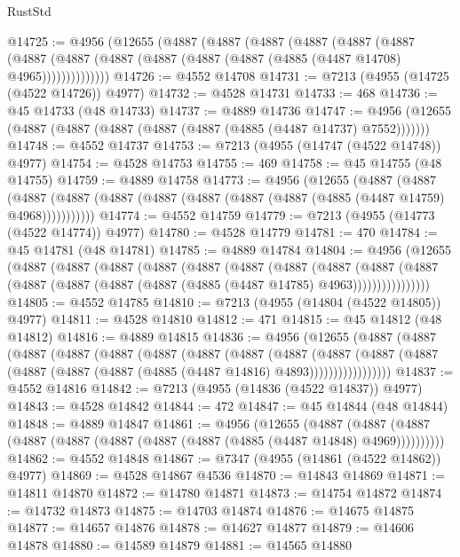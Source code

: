 \begin{lexlean}{RustStd}
\begin{coremodule}
@14725 := @4956
    (@12655
      (@4887
        (@4887
          (@4887
            (@4887
              (@4887
                (@4887
                  (@4887
                    (@4887 (@4887 (@4887 (@4887 (@4887 (@4885 (@4487 @14708) @4965))))))))))))))
@14726 := @4552 @14708
@14731 := @7213 (@4955 (@14725 (@4522 @14726)) @4977)
@14732 := @4528 @14731
@14733 := 468
@14736 := @45 @14733 (@48 @14733)
@14737 := @4889 @14736
@14747 := @4956 (@12655 (@4887 (@4887 (@4887 (@4887 (@4887 (@4885 (@4487 @14737) @7552)))))))
@14748 := @4552 @14737
@14753 := @7213 (@4955 (@14747 (@4522 @14748)) @4977)
@14754 := @4528 @14753
@14755 := 469
@14758 := @45 @14755 (@48 @14755)
@14759 := @4889 @14758
@14773 := @4956
    (@12655
      (@4887
        (@4887
          (@4887 (@4887 (@4887 (@4887 (@4887 (@4887 (@4887 (@4885 (@4487 @14759) @4968)))))))))))
@14774 := @4552 @14759
@14779 := @7213 (@4955 (@14773 (@4522 @14774)) @4977)
@14780 := @4528 @14779
@14781 := 470
@14784 := @45 @14781 (@48 @14781)
@14785 := @4889 @14784
@14804 := @4956
    (@12655
      (@4887
        (@4887
          (@4887
            (@4887
              (@4887
                (@4887
                  (@4887
                    (@4887
                      (@4887
                        (@4887
                          (@4887 (@4887 (@4887 (@4887 (@4885 (@4487 @14785) @4963))))))))))))))))
@14805 := @4552 @14785
@14810 := @7213 (@4955 (@14804 (@4522 @14805)) @4977)
@14811 := @4528 @14810
@14812 := 471
@14815 := @45 @14812 (@48 @14812)
@14816 := @4889 @14815
@14836 := @4956
    (@12655
      (@4887
        (@4887
          (@4887
            (@4887
              (@4887
                (@4887
                  (@4887
                    (@4887
                      (@4887
                        (@4887
                          (@4887
                            (@4887 (@4887 (@4887 (@4887 (@4885 (@4487 @14816) @4893)))))))))))))))))
@14837 := @4552 @14816
@14842 := @7213 (@4955 (@14836 (@4522 @14837)) @4977)
@14843 := @4528 @14842
@14844 := 472
@14847 := @45 @14844 (@48 @14844)
@14848 := @4889 @14847
@14861 := @4956
    (@12655
      (@4887 (@4887 (@4887 (@4887 (@4887 (@4887 (@4887 (@4887 (@4885 (@4487 @14848) @4969))))))))))
@14862 := @4552 @14848
@14867 := @7347 (@4955 (@14861 (@4522 @14862)) @4977)
@14869 := @4528 @14867 @4536
@14870 := @14843 @14869
@14871 := @14811 @14870
@14872 := @14780 @14871
@14873 := @14754 @14872
@14874 := @14732 @14873
@14875 := @14703 @14874
@14876 := @14675 @14875
@14877 := @14657 @14876
@14878 := @14627 @14877
@14879 := @14606 @14878
@14880 := @14589 @14879
@14881 := @14565 @14880

\end{coremodule}
\end{lexlean}

